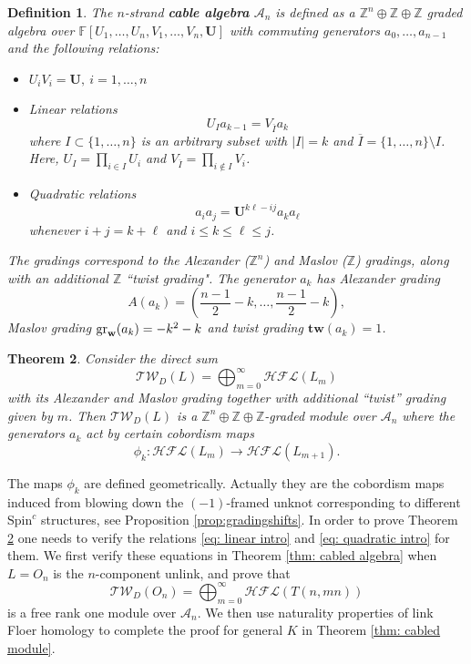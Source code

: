\documentclass{amsart}
\newtheorem{theorem}{Theorem}[section]
\newtheorem{definition}[theorem]{Definition}
\newcommand{\CA}{\mathcal{A}}
\newcommand{\Tw}{\mathcal{TW}}
\newcommand{\F}{\mathbb{F}}
\newcommand{\cHFL}{\mathcal{H\!F\! L}}
\newcommand{\Spin}{\text{Spin}^{c}}
\newcommand{\tw}{\mathbf{tw}}
\newcommand{\w}{\mathbf{w}}
\newcommand{\newword}[1]{\emph{\textbf{#1}}}
\def\gr{\textup{gr}}
\def\w{{\bf{w}}}
\newcommand{\Z}{\mathbb{Z}}
\newcommand{\UU}{\mathbf{U}}
\begin{document}
\begin{definition}
The $n$-strand \newword{cable algebra} $\CA_n$ is defined as a $\Z^n\oplus \Z\oplus \Z$ graded algebra  over $\F[U_1,
\ldots,U_n,V_1,\ldots,V_n,\UU]$ with commuting generators $a_0,\ldots,a_{n-1}$ and the following relations:
\begin{itemize}
\item $U_iV_i=\UU,\ i=1,\ldots,n$
\item Linear relations
\begin{equation}
\label{eq: linear intro}
U_Ia_{k-1}=V_{\overline{I}}a_k
\end{equation}
where $I\subset \{1,\ldots,n\}$ is an arbitrary subset with $|I|=k$ and $\overline{I}=\{1,\ldots,n\}\setminus I$. Here, $U_I=\prod_{i\in I} U_i$ and $V_{\overline{I}}=\prod_{i\notin I}V_i$.
\item Quadratic relations
\begin{equation}
\label{eq: quadratic intro}
a_ia_j=\UU^{k\ell-ij}a_{k}a_{\ell}
\end{equation} 
whenever $i+j=k+\ell$ and $i\le k\le \ell\le j$.
\end{itemize}
The gradings correspond to the Alexander ($\Z^n$) and Maslov ($\Z$) gradings, along with an additional  $\Z$ ``twist grading". The generator $a_k$ has Alexander grading 
$$
A(a_k)=\left(\frac{n-1}{2}-k,\ldots, \frac{n-1}{2}-k\right),
$$
Maslov grading $\gr_{\w}(a_k)=-k^2-k$ and twist grading $\tw(a_k)=1$.
\end{definition}

\begin{theorem}
\label{thm: intro cabled module}
Consider the direct sum
$$
\Tw_D(L)=\bigoplus_{m=0}^{\infty}\cHFL(L_m)
$$
with its Alexander and Maslov grading together with additional ``twist'' grading given by $m$. Then $\Tw_D(L)$ is a $\Z^n\oplus\Z\oplus\Z$-graded module over $\CA_n$ where the generators $a_k$ act by certain cobordism maps 
$$
\phi_k:\cHFL(L_m)\to \cHFL(L_{m+1}).
$$
\end{theorem}

The maps $\phi_k$ are defined geometrically. Actually they are the cobordism maps induced from blowing down the $(-1)$-framed unknot corresponding to different $\Spin$ structures, see Proposition \ref{prop:gradingshifts}.  In order to
 prove Theorem \ref{thm: intro cabled module} one needs to verify the relations \eqref{eq: linear intro} and \eqref{eq: quadratic intro} for them. We first verify these equations in Theorem \ref{thm: cabled algebra} when $L=O_n$ is the $n$-component unlink, and prove that 
$$
\Tw_D(O_n)=\bigoplus_{m=0}^{\infty}\cHFL(T(n,mn))
$$
is a free rank one module over $\CA_n.$
We then use naturality properties of link Floer homology \cite{Zemke} to complete the proof for general $K$ in Theorem \ref{thm: cabled module}.
\end{document}
